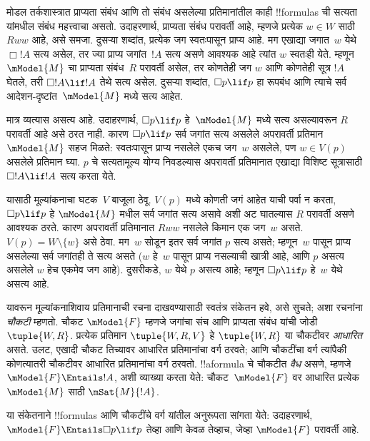 \documentclass[../../../include/open-logic-section]{subfiles}
\begin{document}


मोडल तर्कशास्त्रात प्राप्यता संबंध आणि तो संबंध असलेल्या
प्रतिमानांतील काही !!{formula}s ची सत्यता यांमधील संबंध
महत्त्वाचा असतो. उदाहरणार्थ, प्राप्यता संबंध परावर्ती
आहे, म्हणजे प्रत्येक $w
\in W$ साठी $Rww$ आहे, असे समजा. दुसऱ्या शब्दांत,
प्रत्येक जग स्वतःपासून प्राप्य आहे. मग एखाद्या जगात~$w$
येथे $\Box !A$ सत्य असेल, तर ज्या प्राप्य जगांत~$!A$
सत्य असणे आवश्यक आहे त्यांत $w$ स्वतःही येते. म्हणून
$\mModel{M}$ चा प्राप्यता संबंध~$R$ परावर्ती असेल, तर
कोणतेही जग $w$ आणि कोणतेही सूत्र $!A$ घेतले, तरी
$\Box !A
\lif !A$ तेथे सत्य असेल. दुसऱ्या शब्दांत, $\Box p \lif
p$ हा रूपबंध आणि त्याचे सर्व आदेशन-दृष्टांत~$\mModel{M}$
मध्ये सत्य आहेत.

मात्र व्यत्यास असत्य आहे. उदाहरणार्थ, $\Box p \lif p$
हे~$\mModel{M}$ मध्ये सत्य असल्यावरून $R$ परावर्ती आहे
असे ठरत नाही. कारण $\Box p \lif
p$ सर्व जगांत सत्य असलेले अपरावर्ती प्रतिमान~$\mModel{M}$
सहज मिळते: स्वतःपासून प्राप्य नसलेले एकच जग~$w$ असलेले,
पण $w \in V(p)$ असलेले प्रतिमान घ्या. $p$ चे सत्यतामूल्य
योग्य निवडल्यास अपरावर्ती प्रतिमानात एखाद्या विशिष्ट
सूत्रासाठी $\Box !A \lif !A$ सत्य करता येते.

यासाठी मूल्यांकनाचा घटक~$V$ बाजूला ठेवू. $V(p)$ मध्ये
कोणती जगं आहेत याची पर्वा न करता, $\Box p \lif p$ हे
$\mModel{M}$ मधील सर्व जगांत सत्य असावे अशी अट घातल्यास
$R$ परावर्ती असणे आवश्यक ठरते. कारण अपरावर्ती
प्रतिमानात $Rww$ नसलेले किमान एक जग~$w$ असते.
$V(p) =
W \setminus \{w\}$ असे ठेवा. मग~$w$ सोडून इतर
सर्व जगांत $p$ सत्य असते; म्हणून~$w$ पासून प्राप्य
असलेल्या सर्व जगांतही ते सत्य असते ($w$ हे~$w$ पासून
प्राप्य नसल्याची खात्री आहे, आणि $p$ असत्य असलेले
$w$ हेच एकमेव जग आहे). दुसरीकडे, $w$ येथे $p$ असत्य
आहे; म्हणून $\Box
p \lif p$ हे~$w$ येथे असत्य आहे.

यावरून मूल्यांकनाशिवाय प्रतिमानाची रचना दाखवण्यासाठी
स्वतंत्र संकेतन हवे, असे सुचते; अशा रचनांना \emph{चौकटी}
म्हणतो. चौकट $\mModel{F}$ म्हणजे जगांचा संच आणि
प्राप्यता संबंध यांची जोडी $\tuple{W, R}$.
प्रत्येक प्रतिमान $\tuple{W, R, V}$ हे $\tuple{W, R}$
या चौकटीवर \emph{आधारित} असते. उलट, एखादी चौकट
तिच्यावर आधारित प्रतिमानांचा वर्ग ठरवते; आणि चौकटींचा
वर्ग त्यांपैकी कोणत्यातरी चौकटीवर आधारित प्रतिमानांचा
वर्ग ठरवतो. !!a{formula} चे चौकटीत \emph{वैध} असणे,
म्हणजे $\mModel{F} \Entails !A$, अशी व्याख्या करता येते:
चौकट~$\mModel{F}$ वर आधारित प्रत्येक $\mModel{M}$
साठी $\mSat{M}{!A}$.

या संकेतनाने !!{formula}s आणि चौकटींचे वर्ग यांतील
अनुरूपता सांगता येते: उदाहरणार्थ,
$\mModel{F} \Entails \Box p \lif p$ तेव्हा आणि केवळ
तेव्हाच, जेव्हा $\mModel{F}$ परावर्ती आहे.
\end{document}
